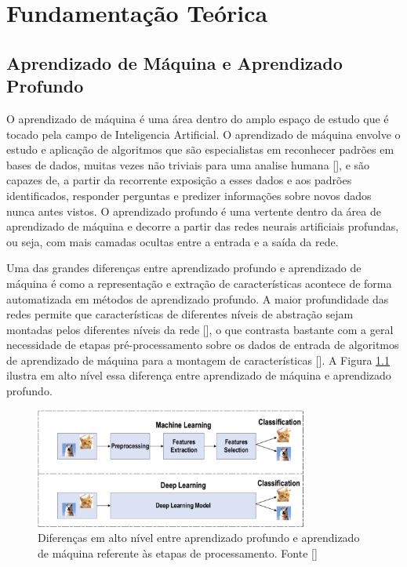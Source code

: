 \chapter{Fundamentação Teórica}


\section{Aprendizado de Máquina e Aprendizado Profundo}
O aprendizado de máquina é uma área dentro do amplo espaço de estudo que é tocado pela campo de Inteligencia Artificial. O aprendizado de máquina envolve o estudo e aplicação de algoritmos que são especialistas em reconhecer padrões em bases de dados, muitas vezes não triviais para uma analise humana [], e são capazes de, a partir da recorrente exposição a esses dados e aos padrões identificados, responder perguntas e predizer informações sobre novos dados nunca antes vistos. O aprendizado profundo é uma vertente dentro da área de aprendizado de máquina e decorre a partir das redes neurais artificiais profundas, ou seja, com mais camadas ocultas entre a entrada e a saída da rede.

Uma das grandes diferenças entre aprendizado profundo e aprendizado de máquina é como a representação e extração de características acontece de forma automatizada em métodos de aprendizado profundo. A maior profundidade das redes permite que características de diferentes níveis de abstração sejam montadas pelos diferentes níveis da rede [], o que contrasta bastante com a geral necessidade de etapas pré-processamento sobre os dados de entrada de algoritmos de aprendizado de máquina para a montagem de características []. A Figura \ref{fig:dl_vs_ml} ilustra em alto nível essa diferença entre aprendizado de máquina e aprendizado profundo.

\begin{figure}
    \centering
    \includegraphics[width=0.8\textwidth]{figs/theory-ml-vs-dl.png}
    \caption{Diferenças em alto nível entre aprendizado profundo e aprendizado de máquina referente às etapas de processamento. Fonte []}
    \label{fig:dl_vs_ml}
\end{figure}

